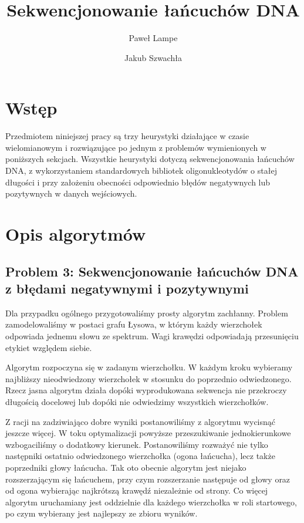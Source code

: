 \documentclass[a4paper]{article}
\title{\textbf{Sekwencjonowanie łańcuchów DNA}}
\date{}
\author{Paweł Lampe \and Jakub Szwachła}
\begin{document}
\maketitle

\section{Wstęp}

Przedmiotem niniejszej pracy są trzy heurystyki działające w czasie wielomianowym i rozwiązujące po jednym z problemów
wymienionych w poniższych sekcjach. Wszystkie heurystyki dotyczą sekwencjonowania łańcuchów DNA, z wykorzystaniem
standardowych bibliotek oligonukleotydów o stałej długości i przy założeniu obecności odpowiednio błędów negatywnych lub
pozytywnych w danych wejściowych.

\section{Opis algorytmów}

\subsection{Problem 3: Sekwencjonowanie łańcuchów DNA z błędami negatywnymi i pozytywnymi}

Dla przypadku ogólnego przygotowaliśmy prosty algorytm zachłanny. Problem zamodelowaliśmy w postaci grafu Łysowa,
w którym każdy wierzchołek odpowiada jednemu słowu ze spektrum. Wagi krawędzi odpowiadają przesunięciu etykiet
względem siebie.

Algorytm rozpoczyna się w zadanym wierzchołku. W każdym kroku wybieramy najbliższy nieodwiedzony wierzchołek w stosunku
do poprzednio odwiedzonego. Rzecz jasna algorytm działa dopóki wyprodukowana sekwencja nie przekroczy długością docelowej
lub dopóki nie odwiedzimy wszystkich wierzchołków.

Z racji na zadziwiająco dobre wyniki postanowiliśmy z algorytmu wycisnąć jeszcze więcej. W toku optymalizacji powyższe
przeszukiwanie jednokierunkowe wzbogaciliśmy o dodatkowy kierunek. Postanowiliśmy rozważyć nie tylko następniki ostatnio
odwiedzonego wierzchołka (ogona łańcucha), lecz także poprzedniki głowy łańcucha. Tak oto obecnie
algorytm jest niejako rozszerzającym się łańcuchem, przy czym rozszerzanie następuje od głowy oraz od ogona
wybierając najkrótszą krawędź niezależnie od strony. Co więcej algorytm uruchamiany jest oddzielnie dla każdego
wierzchołka w roli startowego, po czym wybierany jest najlepszy ze zbioru wyników.
\end{document}
